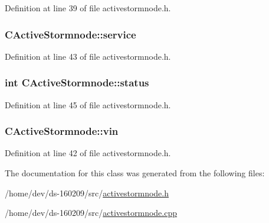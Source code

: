 Definition at line 39 of file activestormnode.\+h.

\hypertarget{class_c_active_stormnode_ac1bd510de0060b100f5c9a1ed520c0c5}{}
\subsubsection[{service}]{ C\+Active\+Stormnode\+::service}\label{class_c_active_stormnode_ac1bd510de0060b100f5c9a1ed520c0c5}


Definition at line 43 of file activestormnode.\+h.

\hypertarget{class_c_active_stormnode_a8ab0534b87cbee04dfae4eff95d83786}{}
\subsubsection[{status}]{\setlength{\rightskip}{0pt plus 5cm}int C\+Active\+Stormnode\+::status}\label{class_c_active_stormnode_a8ab0534b87cbee04dfae4eff95d83786}


Definition at line 45 of file activestormnode.\+h.

\hypertarget{class_c_active_stormnode_aef2103b9e7fdc173e56dbb8f903e1f38}{}
\subsubsection[{vin}]{ C\+Active\+Stormnode\+::vin}\label{class_c_active_stormnode_aef2103b9e7fdc173e56dbb8f903e1f38}


Definition at line 42 of file activestormnode.\+h.



The documentation for this class was generated from the following files\+:\begin{DoxyCompactItemize}
\item 
/home/dev/ds-\/160209/src/\hyperlink{activestormnode_8h}{activestormnode.\+h}\item 
/home/dev/ds-\/160209/src/\hyperlink{activestormnode_8cpp}{activestormnode.\+cpp}\end{DoxyCompactItemize}

